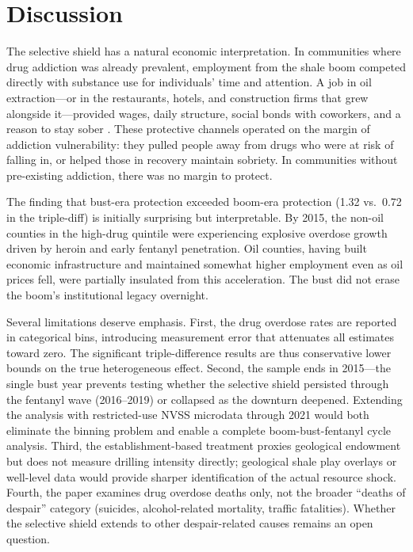 \documentclass[12pt]{article}
\begin{document}
\section{Discussion}

The selective shield has a natural economic interpretation. In communities where drug addiction was already prevalent, employment from the shale boom competed directly with substance use for individuals' time and attention. A job in oil extraction---or in the restaurants, hotels, and construction firms that grew alongside it---provided wages, daily structure, social bonds with coworkers, and a reason to stay sober \citep{krueger2017}. These protective channels operated on the margin of addiction vulnerability: they pulled people away from drugs who were at risk of falling in, or helped those in recovery maintain sobriety. In communities without pre-existing addiction, there was no margin to protect.

The finding that bust-era protection exceeded boom-era protection (1.32 vs.\ 0.72 in the triple-diff) is initially surprising but interpretable. By 2015, the non-oil counties in the high-drug quintile were experiencing explosive overdose growth driven by heroin and early fentanyl penetration. Oil counties, having built economic infrastructure and maintained somewhat higher employment even as oil prices fell, were partially insulated from this acceleration. The bust did not erase the boom's institutional legacy overnight.

Several limitations deserve emphasis. First, the drug overdose rates are reported in categorical bins, introducing measurement error that attenuates all estimates toward zero. The significant triple-difference results are thus conservative lower bounds on the true heterogeneous effect. Second, the sample ends in 2015---the single bust year prevents testing whether the selective shield persisted through the fentanyl wave (2016--2019) or collapsed as the downturn deepened. Extending the analysis with restricted-use NVSS microdata through 2021 would both eliminate the binning problem and enable a complete boom-bust-fentanyl cycle analysis. Third, the establishment-based treatment proxies geological endowment but does not measure drilling intensity directly; geological shale play overlays or well-level data would provide sharper identification of the actual resource shock. Fourth, the paper examines drug overdose deaths only, not the broader ``deaths of despair'' category (suicides, alcohol-related mortality, traffic fatalities). Whether the selective shield extends to other despair-related causes remains an open question.
\end{document}
